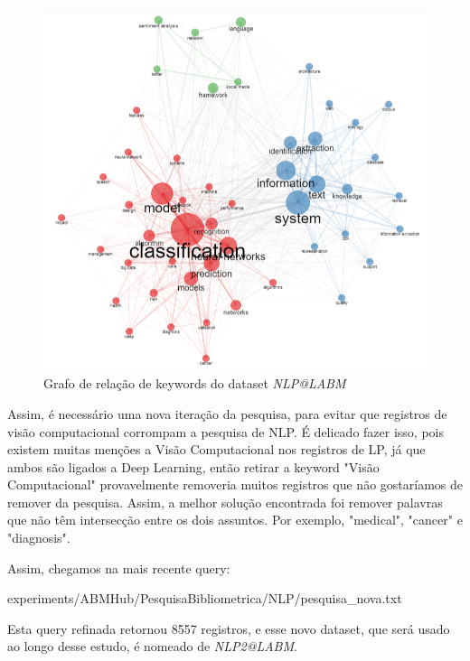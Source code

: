  \begin{figure}
    \centering
    \includegraphics[width=1\textwidth]{experiments/ABMHub/PesquisaBibliometrica/NLP/grafo_keywords.png}
    \caption{Grafo de relação de keywords do dataset \textit{NLP@LABM}}
    \label{fig:ABMHub:NLPgraph1}
\end{figure}

Assim, é necessário uma nova iteração da pesquisa, para evitar que registros de visão computacional corrompam a pesquisa de NLP. É delicado fazer isso, pois existem muitas menções a Visão Computacional nos registros de LP, já que ambos são ligados a Deep Learning, então retirar a keyword "Visão Computacional" provavelmente removeria muitos registros que não gostaríamos de remover da pesquisa. Assim, a melhor solução encontrada foi remover palavras que não têm intersecção entre os dois assuntos. Por exemplo, "medical", "cancer" e "diagnosis".

Assim, chegamos na mais recente query:


{experiments/ABMHub/PesquisaBibliometrica/NLP/pesquisa_nova.txt}

Esta query refinada retornou 8557 registros, e esse novo dataset, que será usado ao longo desse estudo, é nomeado de \textit{NLP2@LABM}.

